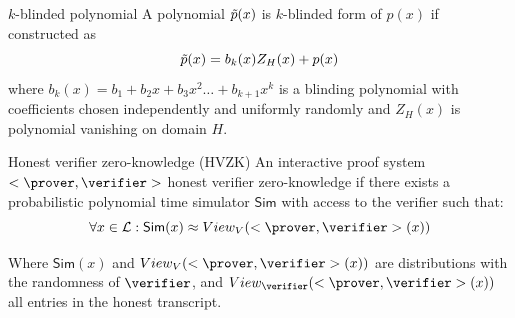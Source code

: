 \begin{definition}{$k$-blinded polynomial}
    A polynomial $\Tilde{p}(x)$ is $k$-blinded form of $p(x)$ if constructed as
    $$\Tilde{p}(x) = b_k(x)Z_H(x) + p(x)$$
    where $b_k(x) = b_1 + b_2x + b_3x^2 \ldots + b_{k+1}x^{k}$ is a blinding polynomial with coefficients chosen independently and uniformly randomly and $Z_H(x)$ is polynomial vanishing on domain $H$.
\end{definition}



    
    


\begin{definition}{Honest verifier zero-knowledge (HVZK)}
    An interactive proof system $<\prover, \verifier>$ honest verifier zero-knowledge if there exists
    a probabilistic polynomial time simulator $\mathsf{Sim}$ with access to the verifier such that:
    $$\forall x \in \mathcal{L}: \mathsf{Sim}(x) \approx View_{V}(<\prover, \verifier>(x))$$
    
    Where $\mathsf{Sim}(x)$ and $View_{V}(<\prover, \verifier>(x))$ are distributions with the randomness of $\verifier$, and $View_{\verifier}(<\prover, \verifier>(x))$ all entries in the honest transcript.
\end{definition}

